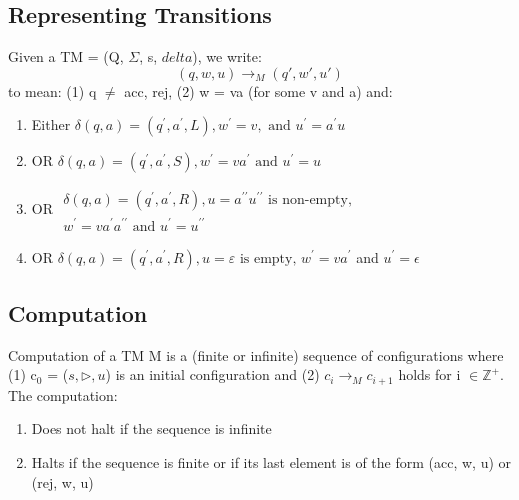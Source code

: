 \documentclass{article}
\begin{document}
\subsection{Representing Transitions}
Given a TM = (Q, $\Sigma$, s, $delta$), we write:
\begin{equation}
    (q, w, u) \rightarrow_{M} (q', w', u')
\end{equation}
to mean: (1) q $\neq$ acc, rej, (2) w = va (for some v and a) and:
\begin{enumerate}
    \item Either $\delta(q, a)=\left(q^{\prime}, a^{\prime}, L\right), w^{\prime}=v, \text { and } u^{\prime}=a^{\prime} u$ 
    \item OR $\delta(q, a)=\left(q^{\prime}, a^{\prime}, S\right), w^{\prime}=v a^{\prime} \text { and } u^{\prime}=u$
    \item OR $\begin{array}{l}{\delta(q, a)=\left(q^{\prime}, a^{\prime}, R\right), u=a^{\prime \prime} u^{\prime \prime} \text { is non-empty, }} \\ {w^{\prime}=v a^{\prime} a^{\prime \prime} \text { and } u^{\prime}=u^{\prime \prime}}\end{array}$
    \item OR $\delta(q, a)=\left(q^{\prime}, a^{\prime}, R\right), u=\varepsilon \text { is empty, } w^{\prime}=v a^{\prime}$ \textvisiblespace and $u^{\prime} = \epsilon$
\end{enumerate}

\subsection{Computation}
Computation of a TM M is a (finite or infinite) sequence of configurations where (1) c$_{0}$ = ($s, \triangleright, u$) is an initial configuration and (2) $c_{i} \rightarrow _{M} c_{i+1}$ holds for i $\in \mathbb{Z}^{+}$. The computation:
\begin{enumerate}
    \item Does not halt if the sequence is infinite
    \item Halts if the sequence is finite or if its last element is of the form (acc, w, u) or (rej, w, u)
\end{enumerate}
\end{document}
